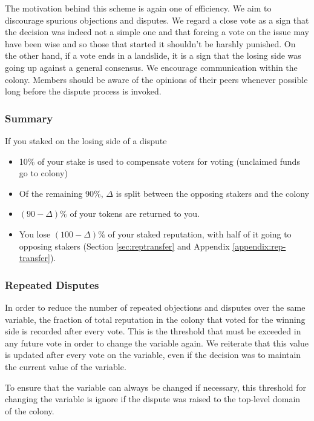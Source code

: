 The motivation behind this scheme is again one of efficiency. We aim to discourage spurious objections and disputes. We regard a close vote as a sign that the decision was indeed not a simple one and that forcing a vote on the issue may have been wise and so those that started it shouldn't be harshly punished. On the other hand, if a vote ends in a landslide, it is a sign that the losing side was going up against a general consensus. We encourage communication within the colony. Members should be aware of the opinions of their peers whenever possible long before the dispute process is invoked.

\subsubsection*{Summary}
If you staked on the losing side of a dispute
\begin{itemize}
 \item 10\% of your stake is used to compensate voters for voting (unclaimed funds go to colony)
 \item Of the remaining 90\%, $\Delta$ is split between the opposing stakers and the colony
 \item $(90-\Delta)\%$ of your tokens are returned to you.
 \item You lose $(100-\Delta)\%$ of your staked reputation, with half of it going to opposing stakers (Section \ref{sec:reptransfer} and Appendix \ref{appendix:rep-transfer}).
\end{itemize}


\subsubsection{Repeated Disputes}\label{sec:repeated-disputes}
In order to reduce the number of repeated objections and disputes over the same variable, the fraction of total reputation in the colony that voted for the winning side is recorded after every vote. This is the threshold that must be exceeded in any future vote in order to change the variable again. We reiterate that this value is updated after every vote on the variable, even if the decision was to maintain the current value of the variable.

To ensure that the variable can always be changed if necessary, this threshold for changing the variable is ignore if the dispute was raised to the top-level domain of the colony.
